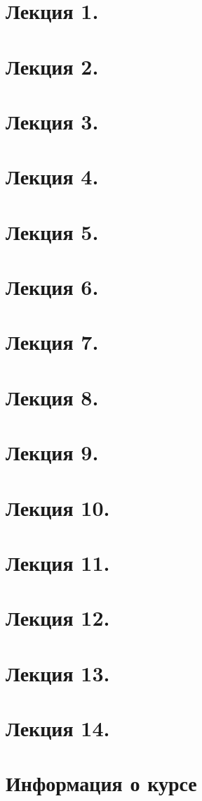 \newpage
\section{Лекция 1.}


\newpage
\section{Лекция 2.}


\newpage
\section{Лекция 3.}


\newpage
\section{Лекция 4.}


\newpage
\section{Лекция 5.}


\newpage
\section{Лекция 6.}


\newpage
\section{Лекция 7.}


\newpage
\section{Лекция 8.}


\newpage
\section{Лекция 9.}

\newpage
\section{Лекция 10.}

\newpage
\section{Лекция 11.}

\newpage
\section{Лекция 12.}

\newpage
\section{Лекция 13.}

\newpage
\section{Лекция 14.}


\newpage
\section{Информация о курсе}
